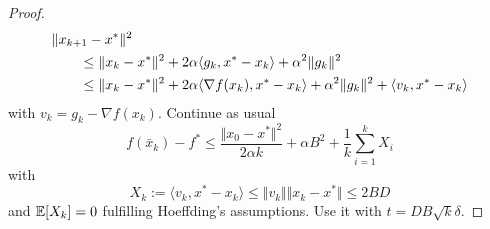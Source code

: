 \documentclass{beamer}
\begin{document}
\begin{frame}
  \begin{adjustwidth}{-1.5em}{-1.5em}
    \begin{minipage}{1.1\textwidth}
    \begin{proof}
      \begin{equation}
        \begin{aligned}
          \MoveEqLeft \Vert x_{k+1} - x^* \Vert^2 \\
          &\le \Vert x_k-x^* \Vert^2 + 2 \alpha \langle g_k, x^*-x_k \rangle + \alpha^2 \Vert g_k \Vert^2 \\
          &\le \Vert x_k-x^* \Vert^2 + 2 \alpha \langle \nabla f(x_k), x^*-x_k \rangle + \alpha^2 \Vert g_k \Vert^2  + \langle v_k, x^*-x_k \rangle\\
        \end{aligned}
      \end{equation}
      with $v_k = g_k -\nabla f(x_k)$.
      Continue as usual
      \begin{equation}
        f(\bar{x}_k) - f^* \le \frac{\Vert x_0-x^* \Vert^2}{2 \alpha k} + \alpha B^2 + \frac{1}{k} \sum_{i=1}^{k} X_i
      \end{equation}
      with
      \begin{equation}
        X_k := \langle v_k, x^*-x_k \rangle \le \Vert v_k \Vert \Vert x_k-x^* \Vert \le 2BD
      \end{equation}
      and $\mathbb{E}[X_k]=0$ fulfilling Hoeffding's assumptions. Use it with $t= DB \sqrt{k}\delta$.
    \end{proof}
    \end{minipage}
  \end{adjustwidth}
\end{frame}
\end{document}
